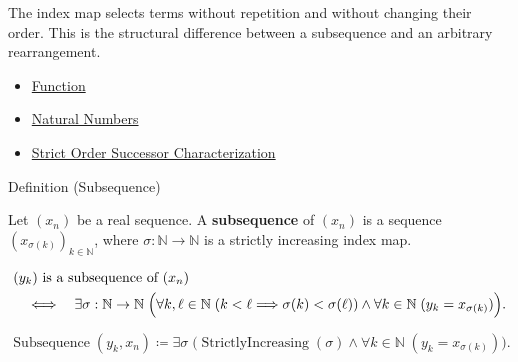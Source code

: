 \begin{remark*}[Interpretation]
The index map selects terms without repetition and without changing their
order. This is the structural difference between a subsequence and an
arbitrary rearrangement.
\end{remark*}

\begin{dependencies}
\begin{itemize}
  \item \hyperref[def:function]{Function}
  \item \hyperref[def:natural-numbers]{Natural Numbers}
  \item \hyperref[thm:strict-order-successor-characterization]{Strict Order Successor Characterization}
\end{itemize}
\end{dependencies}


\begin{definitionbox}{Definition (Subsequence)}
\begin{definition}[Subsequence]
\label{def:subsequence}
Let $(x_n)$ be a real sequence. A \textbf{subsequence} of $(x_n)$ is a
sequence $(x_{\sigma(k)})_{k\in\mathbb{N}}$, where
$\sigma:\mathbb{N}\to\mathbb{N}$ is a strictly increasing index map.
\end{definition}
\end{definitionbox}

\begin{remark*}
\[
\begin{aligned}
&(y_k)\text{ is a subsequence of }(x_n)\\
&\quad\Longleftrightarrow\quad
\exists \sigma:\mathbb{N}\to\mathbb{N}\;
\Bigl(
  \forall k,\ell\in\mathbb{N}\;(k<\ell\Longrightarrow \sigma(k)<\sigma(\ell))
  \land
  \forall k\in\mathbb{N}\;(y_k=x_{\sigma(k)})
\Bigr).
\end{aligned}
\]
\end{remark*}

\begin{remark*}
\[
\operatorname{Subsequence}(y_k,x_n)
\coloneqq
\exists \sigma\;
\bigl(
  \operatorname{StrictlyIncreasing}(\sigma)
  \land
  \forall k\in\mathbb{N}\;(y_k=x_{\sigma(k)})
\bigr).
\]
\end{remark*}

